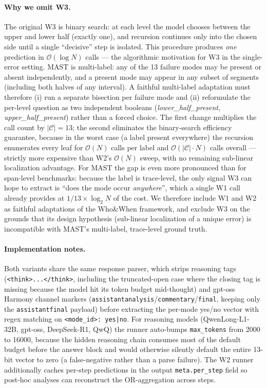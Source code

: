 \paragraph{Why we omit W3.}
The original \textsc{W3} is binary search: at each level the model
chooses between the upper and lower half (exactly one), and
recursion continues only into the chosen side until a single
``decisive'' step is isolated. This procedure produces \emph{one}
prediction in $\mathcal{O}(\log N)$ calls --- the algorithmic
motivation for \textsc{W3} in the single-error setting.
MAST is multi-label: any of the 13 failure modes may be present
or absent independently, and a present mode may appear in any
subset of segments (including both halves of any interval). A
faithful multi-label adaptation must therefore (i) run a separate
bisection per failure mode and (ii) reformulate the per-level
question as two independent booleans
(\textit{lower\_half\_present}, \textit{upper\_half\_present})
rather than a forced choice. The first change multiplies the call
count by $|\mathcal{C}|=13$; the second eliminates the
binary-search efficiency guarantee, because in the worst case (a
label present everywhere) the recursion enumerates every leaf for
$\mathcal{O}(N)$ calls per label and $\mathcal{O}(|\mathcal{C}|
\cdot N)$ calls overall --- strictly more expensive than
\textsc{W2}'s $\mathcal{O}(N)$ sweep, with no remaining
sub-linear localization advantage.
For MAST the gap is even more pronounced than for span-level
benchmarks: because the label is trace-level, the only signal
\textsc{W3} can hope to extract is ``does the mode occur
\emph{anywhere}'', which a single \textsc{W1} call already
provides at $1/13\!\times\!\log_2 N$ of the cost. We therefore
include \textsc{W1} and \textsc{W2} as faithful adaptations of
the Who\&When framework, and exclude \textsc{W3} on the grounds
that its design hypothesis (sub-linear localization of a unique
error) is incompatible with MAST's multi-label, trace-level
ground truth.

\paragraph{Implementation notes.}
Both variants share the same response parser, which strips
reasoning tags (\texttt{<think>...</think>}, including the
truncated-open case where the closing tag is missing because the
model hit its token budget mid-thought) and gpt-oss Harmony
channel markers
(\texttt{assistantanalysis}/\texttt{commentary}/\texttt{final},
keeping only the \texttt{assistantfinal} payload) before
extracting the per-mode yes/no vector with regex matching on
\texttt{<mode\_id>: yes|no}. For reasoning models
(QwenLong-L1-32B, gpt-oss, DeepSeek-R1, QwQ) the runner
auto-bumps \texttt{max\_tokens} from 2000 to 16000, because the
hidden reasoning chain consumes most of the default budget
before the answer block and would otherwise silently default
the entire 13-bit vector to zero (a false-negative rather than
a parse failure). The \textsc{W2} runner additionally caches
per-step predictions in the output \texttt{meta.per\_step}
field so post-hoc analyses can reconstruct the OR-aggregation
across steps.

